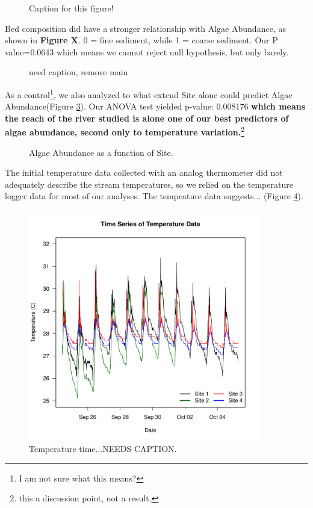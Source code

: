 \documentclass{article}
\begin{document}
\begin{figure}[!ht]
\caption{Caption for this figure!}
\label{fig:canopyalgae}
\end{figure}

Bed composition did have a stronger relationship with Algae Abundance, as shown in \textbf{Figure X}. 0 = fine sediment, while 1 = coarse sediment. Our P value=0.0643 which means we cannot reject null hypothesis, but only barely. 

\begin{figure}[!ht]
\caption{need caption, remove main}
\label{fig:algaesediment}
\end{figure}


As a control\footnote{I am not sure what this means?}, we also analyzed to what extend Site alone could predict Algae Abundance(Figure \ref{fig:algaesite}). Our ANOVA test yielded p-value: 0.008176 \textbf{which means the reach of the river studied is alone one of our best predictors of algae abundance, second only to temperature variation.}\footnote{this a discussion point, not a result.} 

\begin{figure}[!ht]
\caption{Algae Abundance as a function of Site.}
\label{fig:algaesite}
\end{figure}

The initial temperature data collected with an analog thermometer did not adequately describe the stream temperatures, so we relied on the temperature logger data for most of our analyses. The tempeature data suggests... (Figure \ref{Temp}).

\begin{figure}[!ht]
\includegraphics[width=0.90\textwidth]{Figures/Temp}
\caption{Temperature time...NEEDS CAPTION.}
\label{Temp}
\end{figure}
\end{document}
